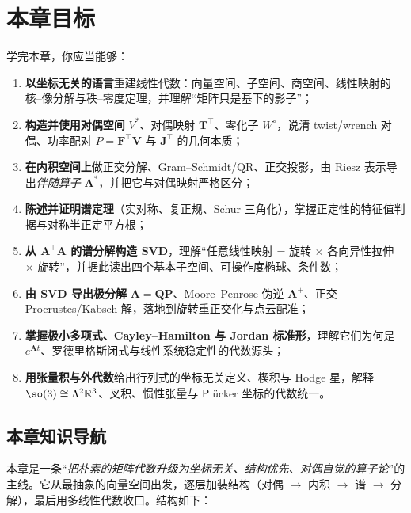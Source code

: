 \section*{本章目标}
学完本章，你应当能够：
\begin{enumerate}
  \item \textbf{以坐标无关的语言}重建线性代数：向量空间、子空间、商空间、线性映射的核--像分解与秩--零度定理，并理解“矩阵只是基下的影子”；
  \item \textbf{构造并使用对偶空间} $V^*$、对偶映射 $\mathbf{T}^\top$、零化子 $W^\circ$，说清 twist/wrench 对偶、功率配对 $P=\mathbf{F}^\top\mathbf{V}$ 与 $\mathbf{J}^\top$ 的几何本质；
  \item \textbf{在内积空间上}做正交分解、Gram--Schmidt/QR、正交投影，由 Riesz 表示导出\emph{伴随算子} $\mathbf{A}^*$，并把它与对偶映射严格区分；
  \item \textbf{陈述并证明谱定理}（实对称、复正规、Schur 三角化），掌握正定性的特征值判据与对称半正定平方根；
  \item \textbf{从 $\mathbf{A}^\top\mathbf{A}$ 的谱分解构造 SVD}，理解“任意线性映射 = 旋转 $\times$ 各向异性拉伸 $\times$ 旋转”，并据此读出四个基本子空间、可操作度椭球、条件数；
  \item \textbf{由 SVD 导出极分解} $\mathbf{A}=\mathbf{Q}\mathbf{P}$、Moore--Penrose 伪逆 $\mathbf{A}^+$、正交 Procrustes/Kabsch 解，落地到旋转重正交化与点云配准；
  \item \textbf{掌握极小多项式、Cayley--Hamilton 与 Jordan 标准形}，理解它们为何是 $e^{\mathbf{A}t}$、罗德里格斯闭式与线性系统稳定性的代数源头；
  \item \textbf{用张量积与外代数}给出行列式的坐标无关定义、楔积与 Hodge 星，解释 $\so(3)\cong\Lambda^2\mathbb{R}^3$、叉积、惯性张量与 Plücker 坐标的代数统一。
\end{enumerate}

\subsection*{本章知识导航}
本章是一条“\emph{把朴素的矩阵代数升级为坐标无关、结构优先、对偶自觉的算子论}”的主线。它从最抽象的向量空间出发，逐层加装结构（对偶 $\to$ 内积 $\to$ 谱 $\to$ 分解），最后用多线性代数收口。结构如下：

